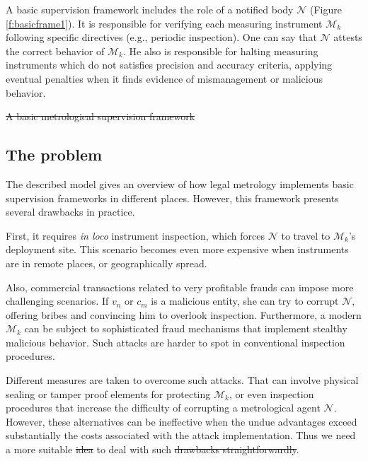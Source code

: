 \documentclass[sigplan]{acmart}
\providecommand{\DIFadd}[1]{{\protect\color{blue}\uwave{#1}}} %
\providecommand{\DIFdel}[1]{{\protect\color{red}\sout{#1}}}                      %
\providecommand{\DIFaddbegin}{} %
\providecommand{\DIFaddend}{} %
\providecommand{\DIFdelbegin}{} %
\providecommand{\DIFdelend}{} %
\providecommand{\DIFdelFL}[1]{\DIFdel{#1}} %
\begin{document}
A basic supervision framework includes the role of a notified body $\mathcal{N}$ (Figure \ref{f:basicframe1}).
It is responsible for verifying each measuring instrument $\mathcal{M}_k$ following specific directives (e.g., periodic inspection).
One can say that $\mathcal{N}$ attests the correct behavior of $\mathcal{M}_k$.
He also is responsible for halting measuring instruments which do not satisfies precision and accuracy criteria, applying eventual penalties when it finds evidence of mismanagement or malicious behavior.

\DIFdelbegin %
{%
\DIFdelFL{A basic metrological supervision framework}}

\DIFdelend \subsection{The problem}
The described model gives an overview of how legal metrology implements basic supervision frameworks in different places.
However, this framework presents several drawbacks in practice.

First, it requires \textit{in loco} instrument inspection, which forces $\mathcal{N}$ to travel to $\mathcal{M}_k$'s deployment site.
This scenario becomes even more expensive when instruments are in remote places, or geographically spread.

Also, commercial transactions related to very profitable frauds can impose more challenging scenarios.
If $v_n$ or $c_m$ is a malicious entity, she can try to corrupt $\mathcal{N}$, offering bribes and convincing him to overlook inspection.
Furthermore, a modern $\mathcal{M}_k$ can be subject to sophisticated fraud mechanisms that implement stealthy malicious behavior.
Such attacks are harder to spot in conventional inspection procedures.

Different measures are taken to overcome such attacks.
That can involve physical sealing or tamper proof elements for protecting $\mathcal{M}_k$, or even inspection procedures that increase the difficulty of corrupting a metrological agent $\mathcal{N}$.
However, these alternatives can be ineffective when the undue advantages exceed substantially the costs associated with the attack implementation.
Thus we need a more suitable \DIFdelbegin \DIFdel{idea }\DIFdelend \DIFaddbegin \DIFadd{approach }\DIFaddend to deal with such \DIFdelbegin \DIFdel{drawbacks straightforwardly}\DIFdelend \DIFaddbegin \DIFadd{problems}\DIFaddend .
\end{document}
